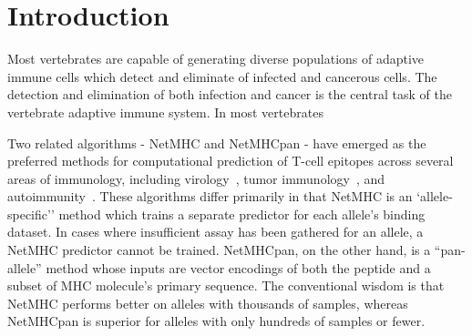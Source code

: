 \section{Introduction}
  
Most vertebrates are capable of generating diverse populations of adaptive immune cells which detect and eliminate of infected and cancerous cells.
The detection and elimination of both infection and cancer is the central task of the vertebrate adaptive immune system. 
In most vertebrates \cite{Anderson_2004}



Two related algorithms - NetMHC and NetMHCpan - have emerged as the preferred methods for computational prediction of T-cell epitopes across several areas of immunology, including virology~\cite{Lund_2011}, tumor immunology~\cite{Gubin_2015}, and autoimmunity~\cite{Abreu_2012}. These algorithms differ primarily in that NetMHC is an `allele-specific'' method which trains a separate predictor for each allele's binding dataset. In cases where insufficient assay has been gathered for an allele, a NetMHC predictor cannot be trained. NetMHCpan, on the other hand, is a ``pan-allele'' method whose inputs are vector encodings of both the peptide and a subset of MHC molecule's primary sequence. The conventional wisdom is that NetMHC performs better on alleles with thousands of samples, whereas NetMHCpan is superior for alleles with only hundreds of samples or fewer. 


